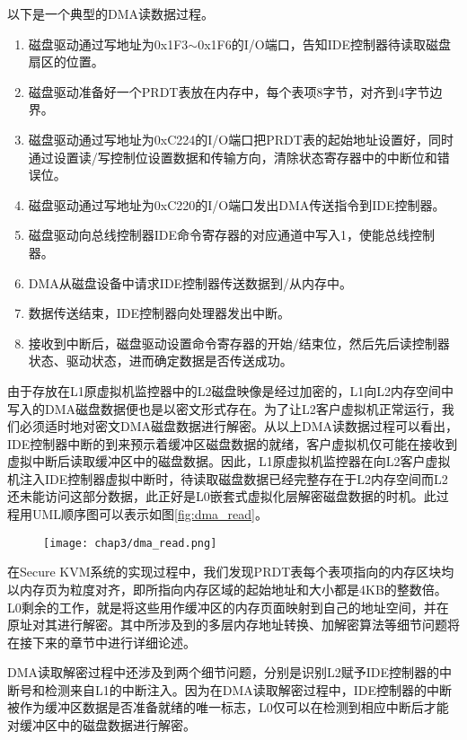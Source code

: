 以下是一个典型的DMA读数据过程。

\begin{enumerate}
\item 磁盘驱动通过写地址为0x1F3$\sim$0x1F6的I/O端口，告知IDE控制器待读取磁盘扇区的位置。
\item 磁盘驱动准备好一个PRDT表放在内存中，每个表项8字节，对齐到4字节边界。
\item 磁盘驱动通过写地址为0xC224的I/O端口把PRDT表的起始地址设置好，同时通过设置读/写控制位设置数据和传输方向，清除状态寄存器中的中断位和错误位。
\item 磁盘驱动通过写地址为0xC220的I/O端口发出DMA传送指令到IDE控制器。
\item 磁盘驱动向总线控制器IDE命令寄存器的对应通道中写入1，使能总线控制器。
\item DMA从磁盘设备中请求IDE控制器传送数据到/从内存中。
\item 数据传送结束，IDE控制器向处理器发出中断。
\item 接收到中断后，磁盘驱动设置命令寄存器的开始/结束位，然后先后读控制器状态、驱动状态，进而确定数据是否传送成功。
\end{enumerate}

由于存放在L1原虚拟机监控器中的L2磁盘映像是经过加密的，L1向L2内存空间中写入的DMA磁盘数据便也是以密文形式存在。为了让L2客户虚拟机正常运行，我们必须适时地对密文DMA磁盘数据进行解密。从以上DMA读数据过程可以看出，IDE控制器中断的到来预示着缓冲区磁盘数据的就绪，客户虚拟机仅可能在接收到虚拟中断后读取缓冲区中的磁盘数据。因此，L1原虚拟机监控器在向L2客户虚拟机注入IDE控制器虚拟中断时，待读取磁盘数据已经完整存在于L2内存空间而L2还未能访问这部分数据，此正好是L0嵌套式虚拟化层解密磁盘数据的时机。此过程用UML顺序图可以表示如图\ref{fig:dma_read}。

\begin{figure}[!htbp]
  \centering
  \texttt{[image: chap3/dma\_read.png]}
\end{figure}

在Secure KVM系统的实现过程中，我们发现PRDT表每个表项指向的内存区块均以内存页为粒度对齐，即所指向内存区域的起始地址和大小都是4KB的整数倍。L0剩余的工作，就是将这些用作缓冲区的内存页面映射到自己的地址空间，并在原址对其进行解密。其中所涉及到的多层内存地址转换、加解密算法等细节问题将在接下来的章节中进行详细论述。

DMA读取解密过程中还涉及到两个细节问题，分别是识别L2赋予IDE控制器的中断号和检测来自L1的中断注入。因为在DMA读取解密过程中，IDE控制器的中断被作为缓冲区数据是否准备就绪的唯一标志，L0仅可以在检测到相应中断后才能对缓冲区中的磁盘数据进行解密。

